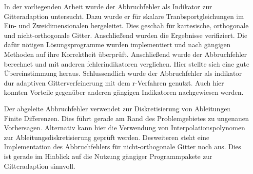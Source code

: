 In der vorliegenden Arbeit wurde der Abbruchfehler als Indikator zur
Gitteradaption untersucht. Dazu wurde er für skalare Tranbsportgleichungen 
im Ein- und Zweidimensionalen hergeleitet. Dies geschah für kartesische,
orthogonale und nicht-orthogonale Gitter.
Anschließend wurden die Ergebnisse verifiziert. Die dafür nötigen Lösungsprogramme
wurden implementiert und nach gängigen Methoden auf ihre Korrektheit überprüft.
Anschließend wurde der Abbruchfehler berechnet und mit anderen fehlerindikatoren verglichen.
Hier stellte sich eine gute Übereinstimmung heraus. Schlussendlich
wurde der Abbruchfehler als indikator dur adaptiven Gitterverfeinerung mit dem r-Verfahren genutzt.
Auch hier konnten Vorteile gegenüber anderen gängigen Indikatoren nachgewiesen werden.

Der abgeleite Abbruchfehler verwendet zur Diskretisierung von Ableitungen
Finite Differenzen. Dies führt gerade am Rand des Problemgebietes zu ungenauen Vorhersagen.
Alternativ kann hier die Verwendung von Interpolationspolynomen 
zur Ableitungsdiskretisierung geprüft werden.
Desweiteren steht eine Implementation des Abbruchfehlers für nicht-orthogonale Gitter
noch aus. Dies ist gerade im Hinblick auf die Nutzung gängiger Programmpakete zur Gitteradaption
sinnvoll.

